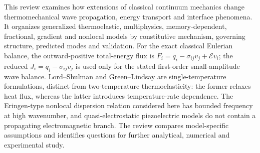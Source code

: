 This review examines how extensions of classical continuum mechanics change thermomechanical wave propagation, energy transport and interface phenomena. It organizes generalized thermoelastic, multiphysics, memory-dependent, fractional, gradient and nonlocal models by constitutive mechanism, governing structure, predicted modes and validation. For the exact classical Eulerian balance, the outward-positive total-energy flux is $F_i=q_i-\sigma_{ij}v_j+\mathcal{E}v_i$; the reduced $J_i=q_i-\sigma_{ij}v_j$ is used only for the stated first-order small-amplitude wave balance. Lord--Shulman and Green--Lindsay are single-temperature formulations, distinct from two-temperature thermoelasticity: the former relaxes heat flux, whereas the latter introduces temperature-rate dependence. The Eringen-type nonlocal dispersion relation considered here has bounded frequency at high wavenumber, and quasi-electrostatic piezoelectric models do not contain a propagating electromagnetic branch. The review compares model-specific assumptions and identifies questions for further analytical, numerical and experimental study.
